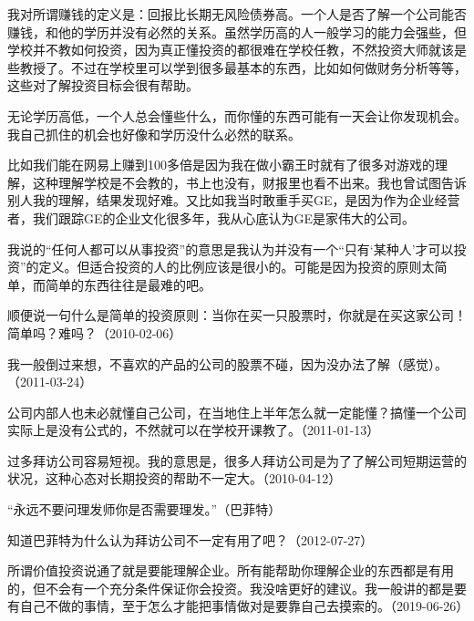 我对所谓赚钱的定义是：回报比长期无风险债券高。一个人是否了解一个公司能否赚钱，和他的学历并没有必然的关系。虽然学历高的人一般学习的能力会强些，但学校并不教如何投资，因为真正懂投资的都很难在学校任教，不然投资大师就该是些教授了。不过在学校里可以学到很多最基本的东西，比如如何做财务分析等等，这些对了解投资目标会很有帮助。

无论学历高低，一个人总会懂些什么，而你懂的东西可能有一天会让你发现机会。我自己抓住的机会也好像和学历没什么必然的联系。

比如我们能在网易上赚到100多倍是因为我在做小霸王时就有了很多对游戏的理解，这种理解学校是不会教的，书上也没有，财报里也看不出来。我也曾试图告诉别人我的理解，结果发现好难。又比如我当时敢重手买GE，是因为作为企业经营者，我们跟踪GE的企业文化很多年，我从心底认为GE是家伟大的公司。

我说的“任何人都可以从事投资”的意思是我认为并没有一个“只有‘某种人’才可以投资”的定义。但适合投资的人的比例应该是很小的。可能是因为投资的原则太简单，而简单的东西往往是最难的吧。

顺便说一句什么是简单的投资原则：当你在买一只股票时，你就是在买这家公司！简单吗？难吗？（2010-02-06）


我一般倒过来想，不喜欢的产品的公司的股票不碰，因为没办法了解（感觉）。（2011-03-24）


公司内部人也未必就懂自己公司，在当地住上半年怎么就一定能懂？搞懂一个公司实际上是没有公式的，不然就可以在学校开课教了。（2011-01-13）

过多拜访公司容易短视。我的意思是，很多人拜访公司是为了了解公司短期运营的状况，这种心态对长期投资的帮助不一定大。（2010-04-12）

“永远不要问理发师你是否需要理发。”（巴菲特）

知道巴菲特为什么认为拜访公司不一定有用了吧？（2012-07-27）

所谓价值投资说通了就是要能理解企业。所有能帮助你理解企业的东西都是有用的，但不会有一个充分条件保证你会投资。我没啥更好的建议。我一般讲的都是要有自己不做的事情，至于怎么才能把事情做对是要靠自己去摸索的。（2019-06-26）


